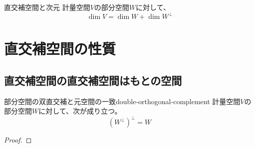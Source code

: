 \documentclass[../../../topic_linear-algebra]{subfiles}
\begin{document}
\begin{theorem*}{直交補空間と次元}
  計量空間$V$の部分空間$W$に対して、
  \begin{equation*}
    \dim V = \dim W + \dim W^\perp
  \end{equation*}
\end{theorem*}

\sectionline
\section{直交補空間の性質}

\subsection{直交補空間の直交補空間はもとの空間}

\begin{theorem}{部分空間の双直交補と元空間の一致}{double-orthogonal-complement}
  計量空間$V$の部分空間$W$に対して、次が成り立つ。
  \begin{equation*}
    (W^\perp)^\perp = W
  \end{equation*}
\end{theorem}

\begin{proof}
  \todo{}
\end{proof}
\end{document}
